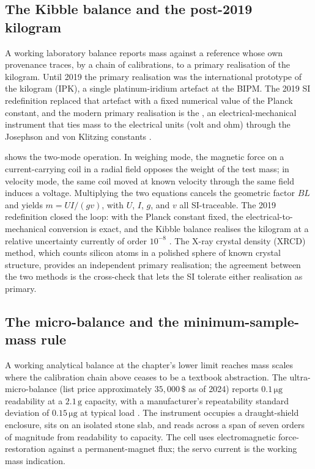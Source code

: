 \subsection{The Kibble balance and the post-2019 kilogram}

A working laboratory balance reports mass against a reference whose
own provenance traces, by a chain of calibrations, to a primary
realisation of the kilogram. Until 2019 the primary realisation was
the international prototype of the kilogram (IPK), a single
platinum-iridium artefact at the BIPM. The 2019 SI redefinition
replaced that artefact with a fixed numerical value of the Planck
constant, and the modern primary realisation is the
, an electrical-mechanical instrument that
ties mass to the electrical units (volt and ohm) through the
Josephson and von Klitzing constants \cite{web:nist-kibble-balance,%
paper:stock-kibble-2018,web:bipm-mise-en-pratique-kilogram-2019}.



 shows the two-mode operation.
In weighing mode, the magnetic force on a current-carrying coil in
a radial field opposes the weight of the test mass; in velocity
mode, the same coil moved at known velocity through the same field
induces a voltage. Multiplying the two equations cancels the
geometric factor $BL$ and yields $m = U I / (g v)$, with $U$, $I$,
$g$, and $v$ all SI-traceable. The 2019 redefinition closed the
loop: with the Planck constant fixed, the electrical-to-mechanical
conversion is exact, and the Kibble balance realises the kilogram at
a relative uncertainty currently of order $10^{-8}$
\cite{paper:stock-kibble-2018}. The X-ray crystal density (XRCD)
method, which counts silicon atoms in a polished sphere of known
crystal structure, provides an independent primary realisation; the
agreement between the two methods is the cross-check that lets the
SI tolerate either realisation as primary.

\subsection{The micro-balance and the minimum-sample-mass rule}

A working analytical balance at the chapter's lower limit reaches
mass scales where the calibration chain above ceases to be a textbook
abstraction. The
 ultra-micro-balance (list price
approximately $35{,}000 \,\$ $ as of 2024) reports
$0.1 \,\si{\micro\gram}$ readability at a $2.1 \,\si{\gram}$ capacity,
with a manufacturer's repeatability standard deviation of
$0.15 \,\si{\micro\gram}$ at typical load
\cite{ch07t3b-web:mettler-xpr2u-datasheet}. The instrument occupies a
draught-shield enclosure, sits on an isolated stone slab, and reads
across a span of seven orders of magnitude from readability to
capacity. The cell uses electromagnetic force-restoration against a
permanent-magnet flux; the servo current is the working mass
indication.

